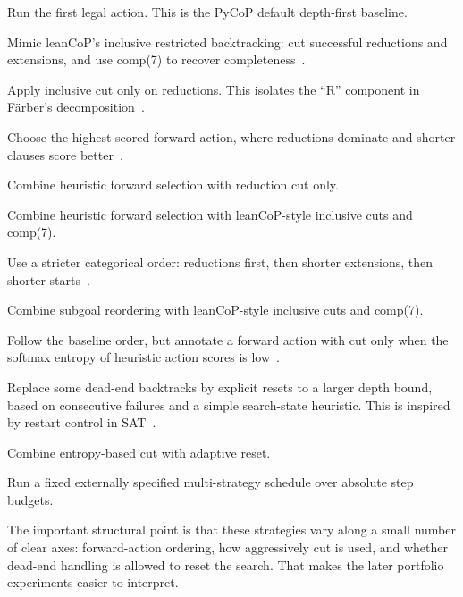 \documentclass[11pt,twocolumn]{article}
\newcommand{\atom}[1]{\colorbox{Gray!30}{\ttfamily #1}}
\newcommand{\citen}[1]{~\parencite{#1}}
\begin{document}
\begin{description}[style=nextline, itemsep=-3pt, leftmargin=18pt]
	\item[FirstAction \emph{\mdseries (control)}] Run the first legal action. This is the PyCoP default depth-first baseline.
	\item[LeanCopCut \emph{\mdseries (control)}] Mimic leanCoP's inclusive restricted backtracking: cut successful reductions and extensions, and use \atom{comp(7)} to recover completeness\citen{ottenLeanCoP20}.
	\item[ReductionCut] Apply inclusive cut only on reductions. This isolates the ``R'' component in Färber's decomposition\citen{farberCuriouslyEffectiveBacktracking2024}.
	\item[HeuristicSelection] Choose the highest-scored forward action, where reductions dominate and shorter clauses score better\citen{letzModelEliminationConnection2001}.
	\item[HeuristicReductionCut] Combine heuristic forward selection with reduction cut only.
	\item[HeuristicCut] Combine heuristic forward selection with leanCoP-style inclusive cuts and \atom{comp(7)}.
	\item[SubgoalReordering] Use a stricter categorical order: reductions first, then shorter extensions, then shorter starts\citen{letzModelEliminationConnection2001}.
	\item[OrderedCut] Combine subgoal reordering with leanCoP-style inclusive cuts and \atom{comp(7)}.
	\item[EntropyCut] Follow the baseline order, but annotate a forward action with \atom{cut} only when the softmax entropy of heuristic action scores is low\citen{zomboriRoleEntropyGuiding2021}.
	\item[AdaptiveReset] Replace some dead-end backtracks by explicit resets to a larger depth bound, based on consecutive failures and a simple search-state heuristic. This is inspired by restart control in SAT\citen{HoldenSATQSAT,liReinforcementLearningBased2024}.
	\item[SmartCut] Combine entropy-based cut with adaptive reset.
\item[InitialSchedule] Run a fixed externally specified multi-strategy schedule over absolute step budgets.
\end{description}

The important structural point is that these strategies vary along a small number of clear axes: forward-action ordering, how aggressively cut is used, and whether dead-end handling is allowed to reset the search. That makes the later portfolio experiments easier to interpret.
\end{document}
